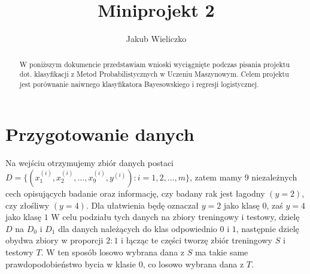 \documentclass[polish,12pt,a4paper]{extarticle}
\title{Miniprojekt 2}
\author{Jakub Wieliczko}
\begin{document}
\begin{abstract}
    W poniższym dokumencie przedstawiam wnioski wyciągnięte podczas pisania projektu dot. klasyfikacji z Metod Probabilistycznych w Uczeniu Maszynowym. Celem projektu jest porównanie naiwnego klasyfikatora Bayesowskiego i regresji logistycznej.
\end{abstract}

\section*{Przygotowanie danych}
Na wejściu otrzymujemy zbiór danych postaci $D = \{(x^{(i)}_1, x^{(i)}_2, \dots, x^{(i)}_9, y^{(i)}): i = 1,2,\dots, m\}$, zatem mamy $9$ niezależnych cech opisujących badanie oraz informację, czy badany rak jest łagodny $(y = 2)$, czy złośliwy $(y = 4)$. Dla ułatwienia będę oznaczał $y = 2$ jako klasę $0$, zaś $y = 4$ jako klasę $1$ W celu podziału tych danych na zbiory treningowy i testowy, dzielę $D$ na $D_0$ i $D_1$ dla danych należących do klas odpowiednio $0$ i $1$, następnie dzielę obydwa zbiory w proporcji $2 : 1$ i łącząc te części tworzę zbiór treningowy $S$ i testowy $T$. W ten sposób losowo wybrana dana z $S$ ma takie same prawdopodobieństwo bycia w klasie $0$, co losowo wybrana dana z $T$.
\end{document}
